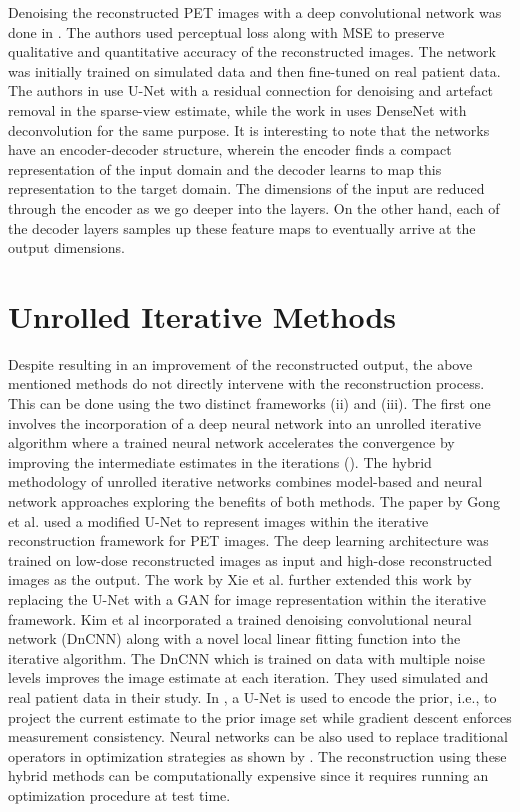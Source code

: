 Denoising the reconstructed \ac{PET} images with a deep convolutional network was done in \cite{gong2018pet}. The authors used perceptual loss along with \ac{MSE} to preserve qualitative and quantitative accuracy of the reconstructed images. The network was initially trained on simulated data and then fine-tuned on real patient data. The authors in \cite{jin2017deep} use U-Net with a residual connection for denoising and artefact removal in the sparse-view estimate, while the work in \cite{zhang2018sparse} uses DenseNet with deconvolution for the same purpose. It is interesting to note that the networks have an encoder-decoder structure, wherein the encoder finds a compact representation of the input domain and the decoder learns to map this representation to the target domain. The dimensions of the input are reduced through the encoder as we go deeper into the layers. On the other hand, each of the decoder layers samples up these feature maps to eventually arrive at the output dimensions. 



\section{Unrolled Iterative Methods}

Despite resulting in an improvement of the reconstructed output, the above mentioned methods do not directly intervene with the reconstruction process. This can be done using the two distinct frameworks (ii) and (iii). The first one involves the incorporation of a deep neural network into an unrolled iterative algorithm where a trained neural network accelerates the convergence by improving the intermediate estimates in the iterations (\cite{gong2019iterative,xie2019generative,kim2018penalized}). The hybrid methodology of unrolled iterative networks combines model-based and neural network approaches exploring the benefits of both methods. 
The paper by Gong et al. used a modified U-Net to represent images within the iterative reconstruction framework for \ac{PET} images. The deep learning architecture was trained on low-dose reconstructed images as input and high-dose reconstructed images as the output. The work by Xie et al. further extended this work by replacing the U-Net with a \ac{GAN} for image representation within the iterative framework. Kim et al incorporated a trained denoising convolutional neural network (DnCNN) along with a novel local linear fitting function into the iterative algorithm. The DnCNN which is trained on data with multiple noise levels improves the image estimate at each iteration. They used simulated and real patient data in their study. In \cite{gupta2018cnn}, a U-Net is used to encode the prior, i.e., to project the current estimate to the prior image set while gradient descent enforces measurement consistency. Neural networks can be also used to replace traditional operators in optimization strategies as shown by \cite{adler2018learned}. The reconstruction using these hybrid methods can be computationally expensive since it requires running an optimization procedure at test time.


